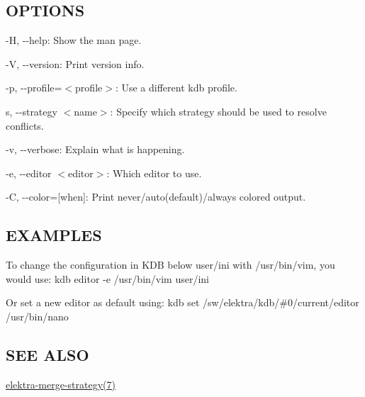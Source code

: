\subsection*{O\+P\+T\+I\+O\+N\+S}


\begin{DoxyItemize}
\item {\ttfamily -\/\+H}, {\ttfamily -\/-\/help}\+: Show the man page.
\item {\ttfamily -\/\+V}, {\ttfamily -\/-\/version}\+: Print version info.
\item {\ttfamily -\/p}, {\ttfamily -\/-\/profile}=$<$profile$>$\+: Use a different kdb profile.
\item {\ttfamily s}, {\ttfamily -\/-\/strategy $<$name$>$}\+: Specify which strategy should be used to resolve conflicts.
\item {\ttfamily -\/v}, {\ttfamily -\/-\/verbose}\+: Explain what is happening.
\item {\ttfamily -\/e}, {\ttfamily -\/-\/editor $<$editor$>$}\+: Which editor to use.
\item {\ttfamily -\/\+C}, {\ttfamily -\/-\/color}=\mbox{[}when\mbox{]}\+: Print never/auto(default)/always colored output.
\end{DoxyItemize}

\subsection*{E\+X\+A\+M\+P\+L\+E\+S}

To change the configuration in K\+D\+B below {\ttfamily user/ini} with {\ttfamily /usr/bin/vim}, you would use\+: {\ttfamily kdb editor -\/e /usr/bin/vim user/ini}

Or set a new editor as default using\+: {\ttfamily kdb set /sw/elektra/kdb/\#0/current/editor /usr/bin/nano}

\subsection*{S\+E\+E A\+L\+S\+O}


\begin{DoxyItemize}
\item \hyperlink{md_doc_help_elektra-merge-strategy_doc_help_elektra-merge-strategy_md}{elektra-\/merge-\/strategy(7)} 
\end{DoxyItemize}